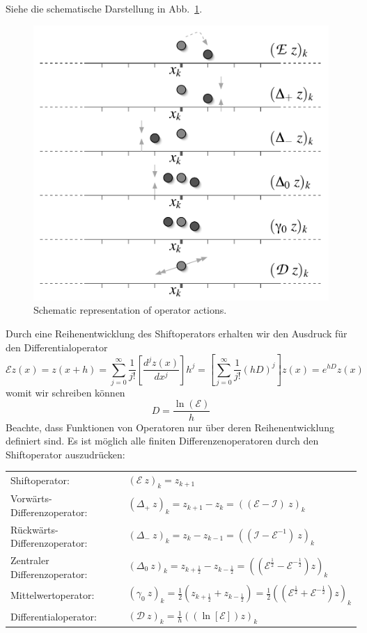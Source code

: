 Siehe die schematische Darstellung in Abb.\ \ref{fig:opaction}.
\begin{figure}[!ht]
	        \begin{center}
                \includegraphics[width=.9\textwidth]{fig/FiniteDifferenceOperators.pdf}
                \caption{Schematic representation of operator actions.\label{fig:opaction}} 
        \end{center}
\end{figure} 

Durch eine Reihenentwicklung des Shiftoperators erhalten wir den Ausdruck
für den Differentialoperator
\[
\mathcal{E}z(x)=z(x+h)=\sum_{j=0}^\infty \frac{1}{j!}
\left[{\frac{d^jz(x)}{dx^j}}\right]h^j=
\left[{\sum_{j=0}^\infty}\frac{1}{j!}(hD)^j\right]z(x)=e^{hD}z(x)
\]
womit wir schreiben können
\[ D=\frac{\ln(\mathcal{E})}{h}\]
Beachte, dass Funktionen von Operatoren nur über deren Reihenentwicklung
definiert sind.  Es ist möglich alle finiten Differenzenoperatoren durch den
Shiftoperator auszudrücken:

\begin{tabular}{ll}
	Shiftoperator:&   $(\mathcal{E}\ z)_k=z_{k+1} $\\
	Vorwärts-Differenzoperator:&       $(\Delta_+\
	z)_k=z_{k+1}-z_{k}=\left( (\mathcal{E}-\mathcal{I})\ z \right)_k$\\
	Rückwärts-Differenzoperator:&     $(\Delta_-\ z)_k=z_{k}-z_{k-1}=
	\left( (\mathcal{I}-\mathcal{E}^{-1})\ z \right)_k$\\
	Zentraler Differenzoperator:&       $(\Delta_0\
	z)_k=z_{k+\frac{1}{2}}-z_{k-\frac{1}{2}}=\left(
	(\mathcal{E}^\frac{1}{2}-\mathcal{E}^{-\frac{1}{2}})z \right)_k$\\
	Mittelwertoperator:&        $(\gamma_0\
	z)_k=\frac{1}{2}(z_{k+\frac{1}{2}}+z_{k-\frac{1}{2}})
	=\frac{1}{2}\left(
	(\mathcal{E}^\frac{1}{2}+\mathcal{E}^{-\frac{1}{2}})z \right)_k$\\
	Differentialoperator:&    $(\mathcal{D}\ z)_k=\frac{1}{h}\left(
	(\ln[\mathcal{E}])z \right)_k$ 
\end{tabular}

